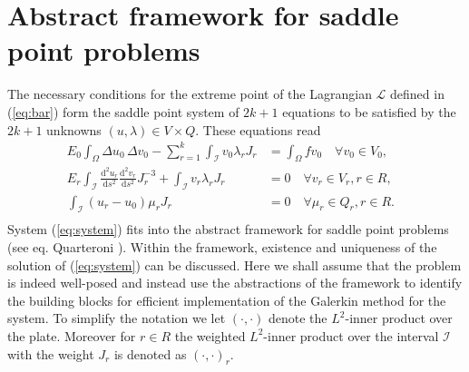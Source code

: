 \documentclass{marine_2015}
\newcommand{\inner}[2]{\ensuremath{\left(#1, #2\right)}}
\newcommand{\rinner}[2]{\ensuremath{\left(#1, #2\right)_r}}
\newcommand{\deriv}[2]{\ensuremath{\frac{\mathrm{d}#1}{\mathrm{d}#2}}}
\begin{document}
\section{Abstract framework for saddle point problems}
\label{sec:abstract}
The necessary conditions for the extreme point of the Lagrangian $\mathcal{L}$
defined in (\ref{eq:bar}) form the saddle point system of $2k+1$ equations to be 
satisfied by the $2k+1$ unknowns $\left(u, \lambda\right)\in V\times Q$. These equations read
\begin{equation}
  \label{eq:system}
  \begin{aligned}
    E_0\displaystyle\int_{\Omega}\Delta u_0\,\Delta v_0-
    \sum_{r=1}^k\int_{\mathcal{I}}v_0\lambda_r J_r &=\displaystyle\int_{\Omega}f
    v_0\quad\forall v_0\in V_0,& \\
    E_r\displaystyle\int_{\mathcal{I}}
    \deriv{^2u_r}{s^2}\deriv{^2v_r}{s^2}J_r^{-3} +
  \int_{\mathcal{I}} v_r \lambda_r J_r &= 0\quad\forall v_r\in V_r, r\in R,&\\
  \int_{\mathcal{I}}\left(u_r-u_0\right)\mu_r J_r &= 0\quad\forall \mu_r\in Q_r,
    r\in R.&\\
  \end{aligned}
\end{equation}
System (\ref{eq:system}) fits into the abstract framework for saddle point
problems (see eq. Quarteroni \cite{quarteroni}). Within the framework, existence
and uniqueness of the solution of (\ref{eq:system}) can be discussed. Here we
shall assume that the problem is indeed well-posed and instead use the abstractions
of the framework to identify the building blocks for efficient implementation
of the Galerkin method for the system. To simplify the notation we
let $\inner{\cdot}{\cdot}$ denote the $L^2$-inner product over the plate.
Moreover for $r\in R$ the weighted $L^2$-inner product over the
interval $\mathcal{I}$ with the weight $J_r$ is denoted as $\rinner{\cdot}{\cdot}$.
\end{document}
